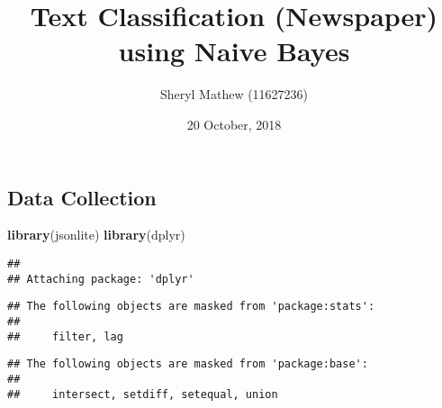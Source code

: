 \documentclass[]{article}
\title{Text Classification (Newspaper) using Naive Bayes}
\author{Sheryl Mathew (11627236)}
\date{20 October, 2018}
\newenvironment{Shaded}{\begin{snugshade}}{\end{snugshade}}
\newcommand{\KeywordTok}[1]{\textcolor[rgb]{0.13,0.29,0.53}{\textbf{#1}}}
\newcommand{\NormalTok}[1]{#1}
\begin{document}
\maketitle

\subsection{Data Collection}\label{data-collection}

\begin{Shaded}
\begin{Highlighting}[]
\KeywordTok{library}\NormalTok{(jsonlite)}
\KeywordTok{library}\NormalTok{(dplyr)}
\end{Highlighting}
\end{Shaded}

\begin{verbatim}
## 
## Attaching package: 'dplyr'
\end{verbatim}

\begin{verbatim}
## The following objects are masked from 'package:stats':
## 
##     filter, lag
\end{verbatim}

\begin{verbatim}
## The following objects are masked from 'package:base':
## 
##     intersect, setdiff, setequal, union
\end{verbatim}
\end{document}
